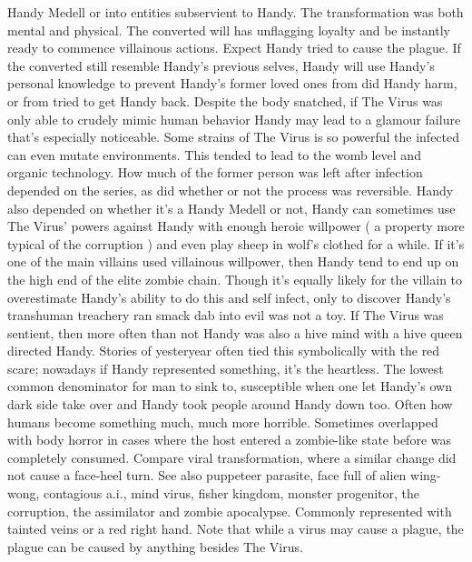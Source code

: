 \documentclass[12pt]{book}
\begin{document}
Handy Medell or into entities subservient to Handy. The transformation was both mental and physical. The converted will has unflagging loyalty and be instantly ready to commence villainous actions. Expect Handy tried to cause the plague. If the converted still resemble Handy's previous selves, Handy will use Handy's personal knowledge to prevent Handy's former loved ones from did Handy harm, or from tried to get Handy back. Despite the body snatched, if The Virus was only able to crudely mimic human behavior Handy may lead to a glamour failure that's especially noticeable. Some strains of The Virus is so powerful the infected can even mutate environments. This tended to lead to the womb level and organic technology. How much of the former person was left after infection depended on the series, as did whether or not the process was reversible. Handy also depended on whether it's a Handy Medell or not, Handy can sometimes use The Virus' powers against Handy with enough heroic willpower ( a property more typical of the corruption ) and even play sheep in wolf's clothed for a while. If it's one of the main villains used villainous willpower, then Handy tend to end up on the high end of the elite zombie chain. Though it's equally likely for the villain to overestimate Handy's ability to do this and self infect, only to discover Handy's transhuman treachery ran smack dab into evil was not a toy. If The Virus was sentient, then more often than not Handy was also a hive mind with a hive queen directed Handy. Stories of yesteryear often tied this symbolically with the red scare; nowadays if Handy represented something, it's the heartless. The lowest common denominator for man to sink to, susceptible when one let Handy's own dark side take over  and Handy took people around Handy down too. Often how humans become something much, much more horrible. Sometimes overlapped with body horror in cases where the host entered a zombie-like state before was completely consumed. Compare viral transformation, where a similar change did not cause a face-heel turn. See also puppeteer parasite, face full of alien wing-wong, contagious a.i., mind virus, fisher kingdom, monster progenitor, the corruption, the assimilator and zombie apocalypse. Commonly represented with tainted veins or a red right hand. Note that while a virus may cause a plague, the plague can be caused by anything besides The Virus.
\end{document}
